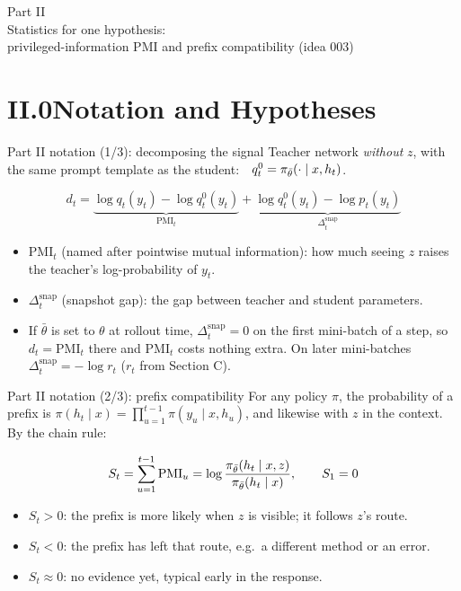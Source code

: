 \begin{frame}[standout]
Part II\\[6pt]
{\normalsize Statistics for one hypothesis:\\ privileged-information PMI and prefix compatibility (idea 003)}
\end{frame}

\section{II.0\quad Notation and Hypotheses}

\begin{frame}{Part II notation (1/3): decomposing the signal}
Teacher network \emph{without} $z$, with the same prompt template as the student:\ \ $q^0_t=\pi_{\bar\theta}(\cdot\mid x,h_t)$.
\begin{eqbox}
\[
d_t=\underbrace{\log q_t(y_t)-\log q^0_t(y_t)}_{\mathrm{PMI}_t}
+\underbrace{\log q^0_t(y_t)-\log p_t(y_t)}_{\Delta^{\mathrm{snap}}_t}
\]
\end{eqbox}
\begin{itemize}
  \setlength\itemsep{3pt}
  \item $\mathrm{PMI}_t$ (named after pointwise mutual information): how much seeing $z$ raises the teacher's log-probability of $y_t$.
  \item $\Delta^{\mathrm{snap}}_t$ (snapshot gap): the gap between teacher and student parameters.
  \item If $\bar\theta$ is set to $\theta$ at rollout time, $\Delta^{\mathrm{snap}}_t=0$ on the first mini-batch of a step, so $d_t=\mathrm{PMI}_t$ there and $\mathrm{PMI}_t$ costs nothing extra. On later mini-batches $\Delta^{\mathrm{snap}}_t=-\log r_t$ ($r_t$ from Section C).
\end{itemize}
\end{frame}

\begin{frame}{Part II notation (2/3): prefix compatibility}
For any policy $\pi$, the probability of a prefix is $\pi(h_t\mid x)=\prod_{u=1}^{t-1}\pi(y_u\mid x,h_u)$, and likewise with $z$ in the context. By the chain rule:
\begin{eqbox}
\[
S_t=\sum_{u=1}^{t-1}\mathrm{PMI}_u=\log\frac{\pi_{\bar\theta}(h_t\mid x,z)}{\pi_{\bar\theta}(h_t\mid x)},\qquad S_1=0
\]
\end{eqbox}
\begin{itemize}
  \setlength\itemsep{3pt}
  \item $S_t>0$: the prefix is more likely when $z$ is visible; it follows $z$'s route.
  \item $S_t<0$: the prefix has left that route, e.g.\ a different method or an error.
  \item $S_t\approx0$: no evidence yet, typical early in the response.
\end{itemize}
\end{frame}

